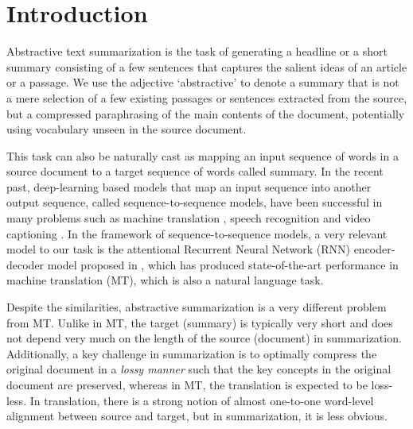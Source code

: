 \section{Introduction}
Abstractive text summarization is the task of generating a headline or a short summary consisting of a few sentences that captures the salient ideas of an article or a passage. We use the adjective `abstractive' to denote a summary that is not a mere selection of a few existing passages or sentences extracted from the source, but a compressed paraphrasing of the main contents of the document, potentially using vocabulary unseen in the source document. 

This task can also be naturally cast as mapping an input sequence of words in a source document to a target sequence of words called summary. In the recent past, deep-learning based models that map an input sequence into another output sequence, called sequence-to-sequence models, have been successful in many problems such as machine translation \cite{nmt}, speech recognition \cite{speech} and video captioning \cite{video_captioning}. In the framework of sequence-to-sequence models, a very relevant model to our task is the attentional Recurrent Neural Network (RNN) encoder-decoder model proposed in 
, which has produced state-of-the-art performance in machine translation (MT), which is also a natural language task.

Despite the similarities, abstractive summarization is a very different problem from MT. Unlike in MT, the target (summary) is typically very short and does not depend very much on the length of the source (document) in summarization. Additionally, a key challenge in summarization is to optimally compress the original document in a {\it lossy manner} such that the key concepts in the original document are preserved, whereas in MT, the translation is expected to be loss-less. In translation, there is a strong notion of almost one-to-one word-level alignment between source and target, but in summarization, it is less obvious. 

